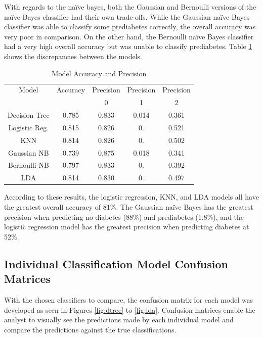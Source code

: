 \documentclass[journal]{IEEEtran}
\begin{document}
With regards to the naïve bayes, both the Gaussian and Bernoulli versions of the naïve Bayes classifier had their own trade-offs. While the Gaussian naïve Bayes classifier was able to classify some prediabetes correctly, the overall accuracy was very poor in comparison. On the other hand, the Bernoulli naïve Bayes classifier had a very high overall accuracy but was unable to classify prediabetes. Table \ref{table:accuracy} shows the discrepancies between the models. 


\begin{table}[h!]
\centering
\begin{tabular}{c | c c c c}
Model & Accuracy & Precision & Precision & Precision\\
    & & 0 & 1 & 2 \\
\hline
Decision Tree	& 0.785 & 0.833 & 0.014 & 0.361 \\
Logistic Reg.	& 0.815 & 0.826 & 0. & 0.521 \\
KNN	& 0.814 & 0.826 & 0. & 0.502 \\
Gaussian NB	& 0.739 & 0.875 & 0.018 & 0.341 \\
Bernoulli NB	& 0.797 & 0.833 & 0. & 0.392 \\
LDA	& 0.814 & 0.830 & 0. & 0.497 \\
\end{tabular}
\caption{Model Accuracy and Precision}
\label{table:accuracy}
\end{table}

According to these results, the logistic regression, KNN, and LDA models all have the greatest overall accuracy of 81\%. The Gaussian naïve Bayes has the greatest precision when predicting no diabetes (88\%) and prediabetes (1.8\%), and the logistic regression model has the greatest precision when predicting diabetes at 52\%.
    
\vspace{20px}

\subsection{Individual Classification Model Confusion Matrices}

With the chosen classifiers to compare, the confusion matrix for each model was developed as seen in Figures \ref{fig:dtree} to \ref{fig:lda}. Confusion matrices enable the analyst to visually see the predictions made by each individual model and compare the predictions against the true classifications.
\end{document}
